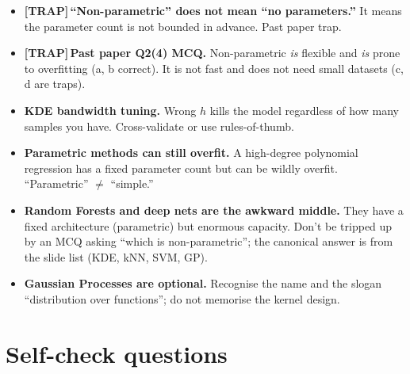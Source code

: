 \documentclass[11pt, a4paper]{article}
\newcommand{\trapflag}{\textcolor{trapBd}{\textbf{[TRAP]}}\,}
\begin{document}
\begin{itemize}
  \item \trapflag{}\textbf{``Non-parametric'' does not mean ``no parameters.''} It means the parameter count is not bounded in advance. Past paper trap.
  \item \trapflag{}\textbf{Past paper Q2(4) MCQ.} Non-parametric \emph{is} flexible and \emph{is} prone to overfitting (a, b correct). It is not fast and does not need small datasets (c, d are traps).
  \item \textbf{KDE bandwidth tuning.} Wrong $h$ kills the model regardless of how many samples you have. Cross-validate or use rules-of-thumb.
  \item \textbf{Parametric methods can still overfit.} A high-degree polynomial regression has a fixed parameter count but can be wildly overfit. ``Parametric'' $\ne$ ``simple.''
  \item \textbf{Random Forests and deep nets are the awkward middle.} They have a fixed architecture (parametric) but enormous capacity. Don't be tripped up by an MCQ asking ``which is non-parametric''; the canonical answer is from the slide list (KDE, kNN, SVM, GP).
  \item \textbf{Gaussian Processes are optional.} Recognise the name and the slogan ``distribution over functions''; do not memorise the kernel design.
\end{itemize}

\section*{Self-check questions}
\end{document}
